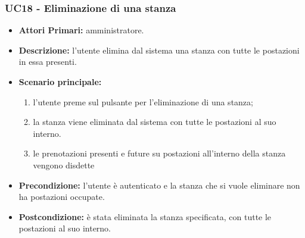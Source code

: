 \subsubsection{ UC18 - Eliminazione di una stanza}
\begin{itemize}
	\item\textbf{Attori Primari:}
	amministratore.
	\item\textbf{Descrizione:} 
	l'utente elimina dal sistema una stanza con tutte le postazioni in essa presenti.
	\item\textbf{Scenario principale:} 
	\begin{enumerate}
		\item l'utente preme sul pulsante per l'eliminazione di una stanza;
		\item la stanza viene eliminata dal sistema con tutte le postazioni al suo interno.
		\item le prenotazioni presenti e future su postazioni all'interno della stanza vengono disdette
	\end{enumerate}
	\item\textbf{Precondizione:} 
	l'utente è autenticato e la stanza che si vuole eliminare non ha postazioni occupate.
	\item\textbf{Postcondizione:}
	è stata eliminata la stanza specificata, con tutte le postazioni al suo interno.
\end{itemize}

